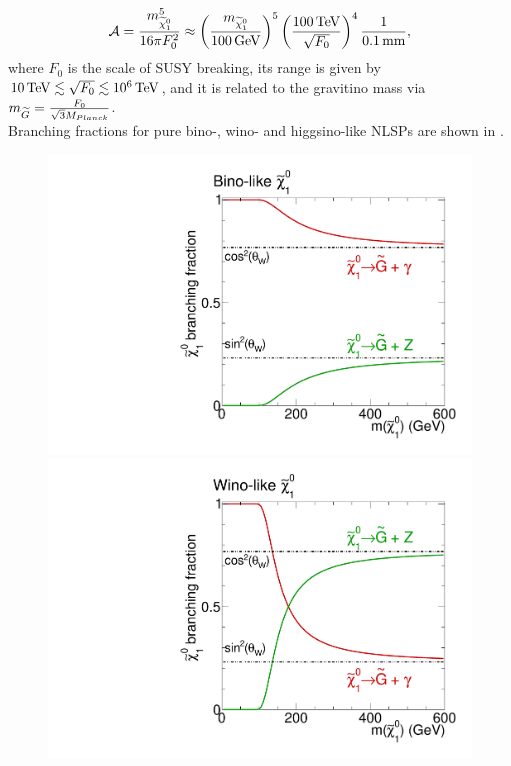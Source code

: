\begin{enumerate}
\begin{equation}
 \mathcal{A} = \frac{m_{\widetilde{\chi}^{0}_{1}}^5}{16\pi F_{0}^{2}}\approx\left(\frac{m_{\widetilde{\chi}^{0}_{1}}}{100\,\text{Ge\hspace{-.08em}V}}\right)^5\left(\frac{100\,\text{Te\hspace{-.08em}V}}{\sqrt{F_0}}\right)^4 \frac{1}{0.1\,\text{mm}},
\end{equation}
where $F_0$ is the scale of SUSY breaking, its  range is given by $10\,\text{Te\hspace{-.08em}V}\lesssim\sqrt{F_0}\lesssim10^6\,\text{Te\hspace{-.08em}V}$, and it is related to the gravitino mass via $m_{\widetilde{G}}=\frac{F_0}{\sqrt{3}M_{Planck}}$.\\
Branching fractions for pure bino-, wino- and higgsino-like NLSPs are shown in .
\begin{figure}[htb]
 \centering
 \includegraphics[width=\pairwidth]{figures/signal/binoBranching}
 \includegraphics[width=\pairwidth]{figures/signal/winoBranching}\\

\end{figure}
\end{enumerate}

